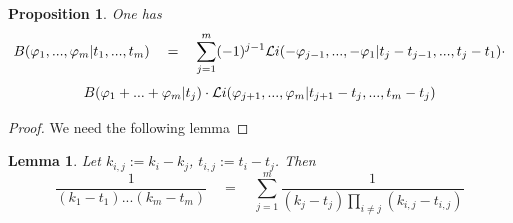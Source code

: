 \documentclass[10pt]{article}
\newtheorem{lemma}[theorem]{Lemma}
\newtheorem{proposition}[theorem]{Proposition}
\begin{document}
\begin{proposition} \label{12.1.00.2} 
One has
$$
B(\varphi_1, ..., \varphi_m | t_1, ..., t_m) \quad = \quad \sum_{j=1}^m (-1)^{j-1}
{\cal L}i(-\varphi_{j-1}, ..., -\varphi_1| t_{j}-t_{j-1}, ...,
t_{j} - t_{1}) \cdot 
$$
\begin{equation} \label{12.1.00.4}
B(\varphi_1 + ... + \varphi_m | t_j) \cdot 
{\cal L}i(\varphi_{j+1}, ...,  \varphi_m| t_{j+1}- t_{j}, ...,
t_{m} -t_{j}) 
\end{equation}
\end{proposition}

\begin{proof} 
We need the following lemma


\end{proof}

\begin{lemma} \label{12.1.00.2lem} Let $k_{i,j}:= k_i - k_j$, $t_{i,j}:= t_i - t_j$. 
Then 
\begin{equation} \label{12.1.00.1}
\frac{1}{(k_1-t_1) ...
 (k_m-t_m) } \quad = \quad \sum_{j=1}^m \frac{1}{(k_j-t_j) \prod_{i \not = j}
(k_{i,j}-t_{i,j}) }
\end{equation}
\end{lemma}
\end{document}
